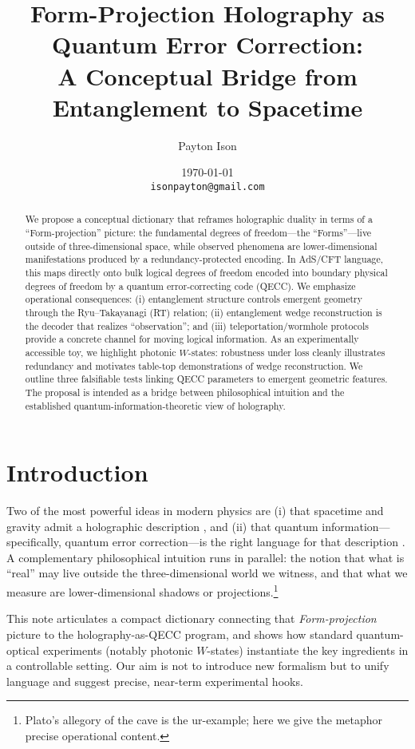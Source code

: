 \documentclass[11pt]{article}
\title{Form-Projection Holography as Quantum Error Correction:\\
A Conceptual Bridge from Entanglement to Spacetime}
\author[1]{Payton Ison}
\affil[1]{The Singularity}
\date{\today\\ \texttt{isonpayton@gmail.com}}
\begin{document}
\maketitle

\begin{abstract}
We propose a conceptual dictionary that reframes holographic duality in terms of a ``Form-projection'' picture: the fundamental degrees of freedom---the ``Forms''---live outside of three-dimensional space, while observed phenomena are lower-dimensional manifestations produced by a redundancy-protected encoding. In AdS/CFT language, this maps directly onto bulk logical degrees of freedom encoded into boundary physical degrees of freedom by a quantum error-correcting code (QECC). We emphasize operational consequences: (i) entanglement structure controls emergent geometry through the Ryu--Takayanagi (RT) relation; (ii) entanglement wedge reconstruction is the decoder that realizes ``observation''; and (iii) teleportation/wormhole protocols provide a concrete channel for moving logical information. As an experimentally accessible toy, we highlight photonic $W$-states: robustness under loss cleanly illustrates redundancy and motivates table-top demonstrations of wedge reconstruction. We outline three falsifiable tests linking QECC parameters to emergent geometric features. The proposal is intended as a bridge between philosophical intuition and the established quantum-information-theoretic view of holography.
\end{abstract}

\section{Introduction}
Two of the most powerful ideas in modern physics are (i) that spacetime and gravity admit a holographic description \cite{Maldacena1998}, and (ii) that quantum information---specifically, quantum error correction---is the right language for that description \cite{ADH2015,Pastawski2015}. A complementary philosophical intuition runs in parallel: the notion that what is ``real'' may live outside the three-dimensional world we witness, and that what we measure are lower-dimensional shadows or projections.\footnote{Plato's allegory of the cave is the ur-example; here we give the metaphor precise operational content.} 

This note articulates a compact dictionary connecting that \emph{Form-projection} picture to the holography-as-QECC program, and shows how standard quantum-optical experiments (notably photonic $W$-states) instantiate the key ingredients in a controllable setting. Our aim is not to introduce new formalism but to unify language and suggest precise, near-term experimental hooks.
\end{document}
